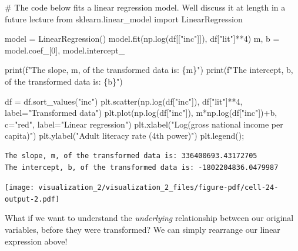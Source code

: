 \documentclass[
  letterpaper,
  DIV=11,
  numbers=noendperiod]{scrreprt}
\newenvironment{Shaded}{\begin{snugshade}}{\end{snugshade}}
\newcommand{\BuiltInTok}[1]{\textcolor[rgb]{0.00,0.23,0.31}{#1}}
\newcommand{\CommentTok}[1]{\textcolor[rgb]{0.37,0.37,0.37}{#1}}
\newcommand{\DecValTok}[1]{\textcolor[rgb]{0.68,0.00,0.00}{#1}}
\newcommand{\ImportTok}[1]{\textcolor[rgb]{0.00,0.46,0.62}{#1}}
\newcommand{\NormalTok}[1]{\textcolor[rgb]{0.00,0.23,0.31}{#1}}
\newcommand{\OperatorTok}[1]{\textcolor[rgb]{0.37,0.37,0.37}{#1}}
\newcommand{\SpecialCharTok}[1]{\textcolor[rgb]{0.37,0.37,0.37}{#1}}
\newcommand{\SpecialStringTok}[1]{\textcolor[rgb]{0.13,0.47,0.30}{#1}}
\newcommand{\StringTok}[1]{\textcolor[rgb]{0.13,0.47,0.30}{#1}}
\begin{document}
\begin{Shaded}
\begin{Highlighting}[]
\CommentTok{\# The code below fits a linear regression model. We\textquotesingle{}ll discuss it at length in a future lecture}
\ImportTok{from}\NormalTok{ sklearn.linear\_model }\ImportTok{import}\NormalTok{ LinearRegression}

\NormalTok{model }\OperatorTok{=}\NormalTok{ LinearRegression()}
\NormalTok{model.fit(np.log(df[[}\StringTok{"inc"}\NormalTok{]]), df[}\StringTok{"lit"}\NormalTok{]}\OperatorTok{**}\DecValTok{4}\NormalTok{)}
\NormalTok{m, b }\OperatorTok{=}\NormalTok{ model.coef\_[}\DecValTok{0}\NormalTok{], model.intercept\_}

\BuiltInTok{print}\NormalTok{(}\SpecialStringTok{f"The slope, m, of the transformed data is: }\SpecialCharTok{\{}\NormalTok{m}\SpecialCharTok{\}}\SpecialStringTok{"}\NormalTok{)}
\BuiltInTok{print}\NormalTok{(}\SpecialStringTok{f"The intercept, b, of the transformed data is: }\SpecialCharTok{\{}\NormalTok{b}\SpecialCharTok{\}}\SpecialStringTok{"}\NormalTok{)}

\NormalTok{df }\OperatorTok{=}\NormalTok{ df.sort\_values(}\StringTok{"inc"}\NormalTok{)}
\NormalTok{plt.scatter(np.log(df[}\StringTok{"inc"}\NormalTok{]), df[}\StringTok{"lit"}\NormalTok{]}\OperatorTok{**}\DecValTok{4}\NormalTok{, label}\OperatorTok{=}\StringTok{"Transformed data"}\NormalTok{)}
\NormalTok{plt.plot(np.log(df[}\StringTok{"inc"}\NormalTok{]), m}\OperatorTok{*}\NormalTok{np.log(df[}\StringTok{"inc"}\NormalTok{])}\OperatorTok{+}\NormalTok{b, c}\OperatorTok{=}\StringTok{"red"}\NormalTok{, label}\OperatorTok{=}\StringTok{"Linear regression"}\NormalTok{)}
\NormalTok{plt.xlabel(}\StringTok{"Log(gross national income per capita)"}\NormalTok{)}
\NormalTok{plt.ylabel(}\StringTok{"Adult literacy rate (4th power)"}\NormalTok{)}
\NormalTok{plt.legend()}\OperatorTok{;}
\end{Highlighting}
\end{Shaded}

\begin{verbatim}
The slope, m, of the transformed data is: 336400693.43172705
The intercept, b, of the transformed data is: -1802204836.0479987
\end{verbatim}

\texttt{[image: visualization\_2/visualization\_2\_files/figure-pdf/cell-24-output-2.pdf]}

What if we want to understand the \emph{underlying} relationship between
our original variables, before they were transformed? We can simply
rearrange our linear expression above!
\end{document}
